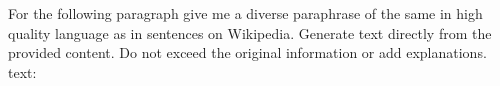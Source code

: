 
\begin{tcolorbox}[title = {Editing Template},breakable]
\small
For the following paragraph give me a diverse paraphrase of the same in high quality language as in sentences on Wikipedia. Generate text directly from the provided content. Do not exceed the original information or add explanations. \\
text:
\end{tcolorbox}